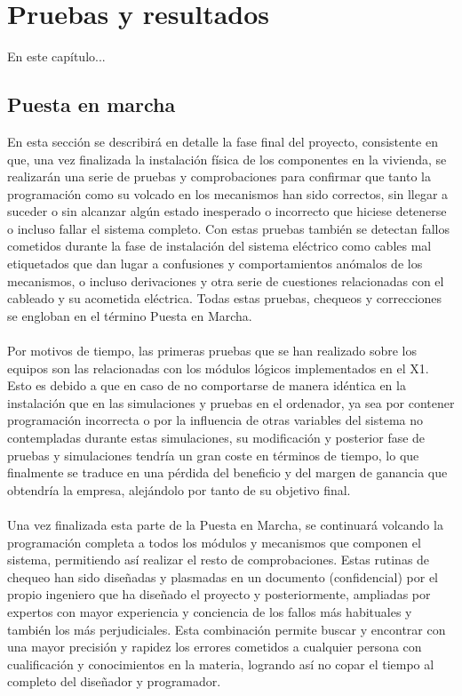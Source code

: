 \chapter{Pruebas y resultados}

En este capítulo...


\section{Puesta en marcha}

En esta sección se describirá en detalle la fase final del proyecto, consistente en que, una vez finalizada la instalación física de los componentes en la vivienda, se realizarán una serie de pruebas y comprobaciones para confirmar que tanto la programación como su volcado en los mecanismos han sido correctos, sin llegar a suceder o sin alcanzar algún estado inesperado o incorrecto que hiciese detenerse o incluso fallar el sistema completo. Con estas pruebas también se detectan fallos cometidos durante la fase de instalación del sistema eléctrico como cables mal etiquetados que dan lugar a confusiones y comportamientos anómalos de los mecanismos, o incluso derivaciones y otra serie de cuestiones relacionadas con el cableado y su acometida eléctrica. Todas estas pruebas, chequeos y correcciones se engloban en el término Puesta en Marcha.\\\\

Por motivos de tiempo, las primeras pruebas que se han realizado sobre los equipos son las relacionadas con los módulos lógicos implementados en el X1. Esto es debido a que en caso de no comportarse de manera idéntica en la instalación que en las simulaciones y pruebas en el ordenador, ya sea por contener programación incorrecta o por la influencia de otras variables del sistema no contempladas durante estas simulaciones, su modificación y posterior fase de pruebas y simulaciones tendría un gran coste en términos de tiempo, lo que finalmente se traduce en una pérdida del beneficio y del margen de ganancia que obtendría la empresa, alejándolo por tanto de su objetivo final.\\\\

Una vez finalizada esta parte de la Puesta en Marcha, se continuará volcando la programación completa a todos los módulos y mecanismos que componen el sistema, permitiendo así realizar el resto de comprobaciones. Estas rutinas de chequeo han sido diseñadas y plasmadas en un documento (confidencial) por el propio ingeniero que ha diseñado el proyecto y posteriormente, ampliadas por expertos con mayor experiencia y conciencia de los fallos más habituales y también los más perjudiciales. Esta combinación permite buscar y encontrar con una mayor precisión y rapidez los errores cometidos a cualquier persona con cualificación y conocimientos en la materia, logrando así no copar el tiempo al completo del diseñador y programador. \\

